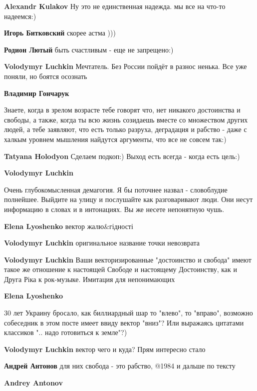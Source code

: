 \begin{itemize}
\begin{itemize}
\textbf{Alexandr Kulakov} Ну это не единственная надежда. мы все на что-то надеемся:)

\textbf{Игорь Битковский} скорее астма )))

\textbf{Родион Лютый} быть счастливым - еще не запрещено:)

\textbf{Volodymyr Luchkin}
Мечтатель. Без России пойдёт в разнос ненька. Все уже поняли, но боятся осознать

\textbf{Владимир Гончарук} 

Знаете, когда в зрелом возрасте тебе говорят что, нет никакого достоинства и
свободы, а также, когда ты всю жизнь созидаешь вместе со множеством других
людей, а тебе заявляют, что есть только разруха, деградация и рабство - даже с
халкым уровнем мышления найдутся аргументы, что все не совсем так:)


\textbf{Tatyana Holodyon} Сделаем подкоп:) Выход есть всегда - когда есть цель:)

\textbf{Volodymyr Luchkin} 

Очень глубокомысленная демагогия. Я бы поточнее назвал - словоблудие полнейшее.
Выйдите на улицу и послушайте как разговаривают люди. Они несут информацию в
словах и в интонациях. Вы же несете непонятную чушь.


\textbf{Elena Lyoshenko} вектор жалю\&гідності

\textbf{Volodymyr Luchkin} оригинальное название точки невозврата

\textbf{Volodymyr Luchkin} Ваши векторизированные "достоинство и свобода" имеют такое же отношение к настоящей Свободе и настоящему Достоинству, как и Друга Ріка к рок-музыке. Имитация для непонимающих

\textbf{Elena Lyoshenko}

30 лет Украину бросало, как биллиардный шар то "влево", то "вправо", возможно
собеседник в этом посте имеет ввиду вектор "вниз"? Или выражаясь цитатами
классиков ".. надо готовиться к земле"?)


\textbf{Volodymyr Luchkin} вектор чего и куда? Прям интересно стало

\textbf{Андрей Антонов} для них свобода - это рабство, @1984 и дальше по тексту

\textbf{Andrey Antonov} 


\end{itemize}
\end{itemize}
